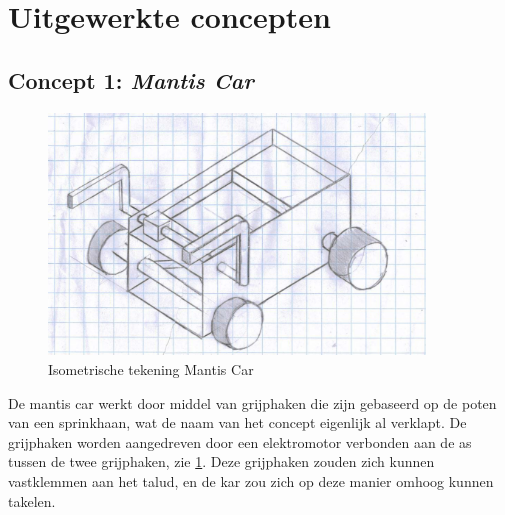 \section{Uitgewerkte concepten}
\label{se:totaalconcepten}



\subsection{Concept 1: \textit{Mantis Car}} 
\label{se:concept_1_mantis_car}

\begin{figure}[H]
    \centering
    \includegraphics[width = 100mm]{04_idee_ontwikkeling/deeloplossing_mantis.JPG}
    \caption{Isometrische tekening Mantis Car}
    \label{fig:deeloplossing_mantis}
\end{figure}

De mantis car werkt door middel van grijphaken die zijn gebaseerd op de poten van een sprinkhaan, wat de naam van het concept eigenlijk al verklapt. De grijphaken worden aangedreven door een elektromotor verbonden aan de as tussen de twee grijphaken, zie \cref{fig:deeloplossing_mantis}. Deze grijphaken zouden zich kunnen vastklemmen aan het talud, en de kar zou zich op deze manier omhoog kunnen takelen.\\

